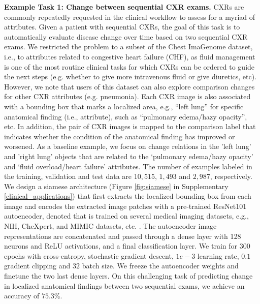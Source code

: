 \textbf{Example Task 1: Change between sequential CXR exams.} CXRs are commonly repeatedly requested in the clinical workflow to assess for a myriad of attributes. Given a patient with sequential CXRs, the goal of this task is to automatically evaluate disease change over time based on two sequential CXR exams. We restricted the problem to a subset of the Chest ImaGenome dataset, i.e., to attributes related to congestive heart failure (CHF), as fluid management is one of the most routine clinical tasks for which CXRs can be ordered to guide the next steps (e.g. whether to give more intravenous fluid or give diuretics, etc). However, we note that users of this dataset can also explore comparison changes for other CXR attributes (e.g. pneumonia). Each CXR image is also associated with a bounding box that marks a localized area, e.g., ``left lung'' for specific anatomical finding (i.e., attribute), such as ``pulmonary edema/hazy opacity'', etc. In addition, the pair of CXR images is mapped to the comparison label that indicates whether the condition of the anatomical finding has improved or worsened. As a baseline example, we focus on change relations in the 'left lung' and 'right lung' objects that are related to the `pulmonary edema/hazy opacity' and `fluid overload/heart failure' attributes. The number of examples labeled in the training, validation and test data are $10,515$, $1,493$ and $2,987$, respectively. 
We design a siamese architecture (Figure \ref{fig:siamese} in Supplementary \ref{clinical_applications}) that first extracts the localized bounding box from each image and encodes the extracted image patches with a pre-trained ResNet101 autoencoder, denoted that is trained on several medical imaging datasets, e.g., NIH, CheXpert, and MIMIC datasets, etc. \cite{irvin2019chexpert,johnson2019mimic,wang2017chestx}. The autoencoder image representations are concatenated and passed through a dense layer with 128 neurons and ReLU activations, and a final classification layer. 
We train for $300$ epochs with cross-entropy, stochastic gradient descent, $1e-3$ learning rate, $0.1$ gradient clipping and $32$ batch size. We freeze the autoencoder weights and finetune the two last dense layers. On this challenging task of predicting change in localized anatomical findings between two sequential exams, we achieve an accuracy of $75.3\%$. %

